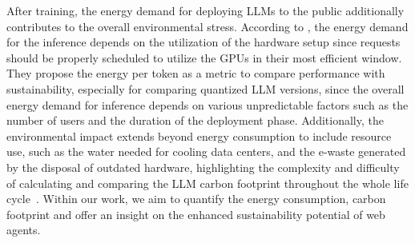 After training, the energy demand for deploying LLMs to the public additionally contributes to the overall environmental stress.
According to \citet{Samsi2023From}, the energy demand for the inference depends on the utilization of the hardware setup since requests should be properly scheduled to utilize the GPUs in their most efficient window.
They propose the energy per token as a metric to compare performance with sustainability, especially for comparing quantized LLM versions, since the overall energy demand for inference depends on various unpredictable factors such as the number of users and the duration of the deployment phase.
Additionally, the environmental impact extends beyond energy consumption to include resource use, such as the water needed for cooling data centers, and the e-waste generated by the disposal of outdated hardware, highlighting the complexity and difficulty of calculating and comparing the LLM carbon footprint throughout the whole life cycle~\cite{patterson2021carbon}.
Within our work, we aim to quantify the energy consumption, carbon footprint and offer an insight on the enhanced sustainability potential of web agents.
 
%